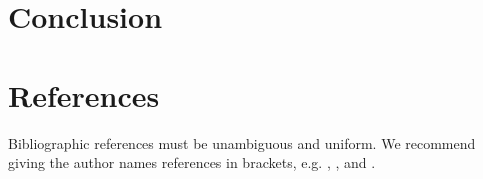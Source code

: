 \documentclass[12pt]{article}
\begin{document}
\section{Conclusion}

\section{References}


Bibliographic references must be unambiguous and uniform.  We recommend giving
the author names references in brackets, e.g. \cite{knuth:84},
\cite{boulic:91}, and \cite{smith:99}.




\end{document}
